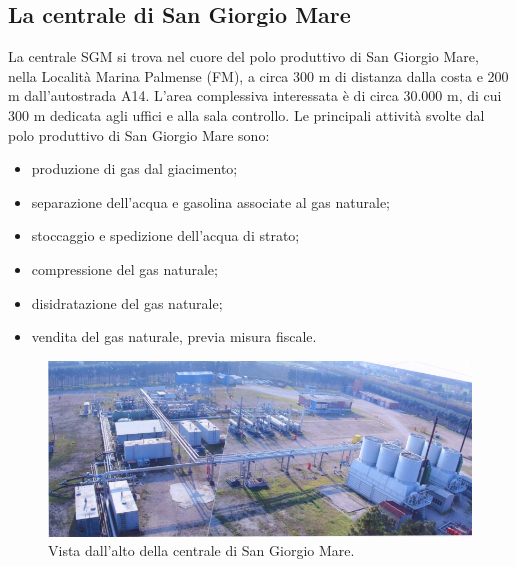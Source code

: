 \subsection{La centrale di San Giorgio Mare}
La centrale SGM si trova nel cuore del polo produttivo di San Giorgio Mare, nella Località Marina Palmense (FM), a circa 300 m di distanza dalla costa e 200 m dall'autostrada A14. L'area complessiva interessata è di circa 30.000 m, di cui 300 m dedicata agli uffici e alla sala controllo.
Le principali attività svolte dal polo produttivo di San Giorgio Mare sono:
\begin{itemize}
 	\item produzione di gas dal giacimento;
 	\item separazione dell'acqua e gasolina associate al gas naturale;
 	\item stoccaggio e spedizione dell'acqua di strato;
 	\item compressione del gas naturale;
 	\item disidratazione del gas naturale;
 	\item vendita del gas naturale, previa misura fiscale.
\end{itemize}
\begin{figure}
    \centering
    \includegraphics[width=\textwidth]{fig/test/centrale/sgm-alto}
    \caption{Vista dall'alto della centrale di San Giorgio Mare.}
    \label{fig:sgm-alto}
\end{figure}

